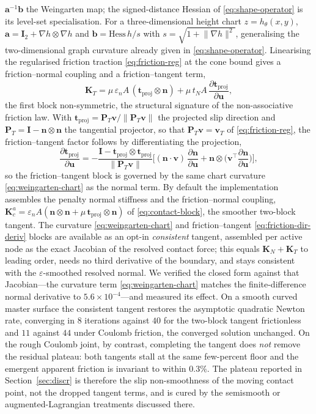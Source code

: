 \documentclass{svjour3}                 %
\newcommand{\norm}[1]{\lVert#1\rVert}
\newcommand{\nbf}{\bm{n}}
\newcommand{\tbf}{\bm{t}}
\newcommand{\ubf}{\bm{u}}
\newcommand{\vbf}{\bm{v}}
\newcommand{\grad}{\nabla}
\begin{document}
\begin{appendix}
$\bm a^{-1}\bm b$ the Weingarten map; the signed-distance Hessian of \eqref{eq:shape-operator} is its level-set
specialisation. For a three-dimensional height chart $z=h_\theta(x,y)$, $\bm a=\bm I_2+\grad h\otimes\grad h$ and
$\bm b=\mathrm{Hess}\,h/s$ with $s=\sqrt{1+\norm{\grad h}^2}$, generalising the two-dimensional graph curvature
already given in \eqref{eq:shape-operator}. Linearising the
regularised friction traction \eqref{eq:friction-reg} at the cone bound gives a friction--normal coupling and a
friction--tangent term,
\begin{equation}\label{eq:lin-friction}
\bm K_T=\mu\,\varepsilon_n A\,(\tbf_{\mathrm{proj}}\otimes\nbf)
+\mu\,t_N A\,\frac{\partial\tbf_{\mathrm{proj}}}{\partial\ubf},
\end{equation}
the first block non-symmetric, the structural signature of the non-associative friction law. With
$\tbf_{\mathrm{proj}}=\bm P_T\vbf/\norm{\bm P_T\vbf}$ the projected slip direction and
$\bm P_T=\bm I-\nbf\otimes\nbf$ the tangential projector, so that $\bm P_T\vbf=\vbf_T$ of
\eqref{eq:friction-reg}, the friction--tangent factor follows by differentiating the projection,
\begin{equation}\label{eq:friction-dir-deriv}
\frac{\partial\tbf_{\mathrm{proj}}}{\partial\ubf}
=-\frac{\bm I-\tbf_{\mathrm{proj}}\otimes\tbf_{\mathrm{proj}}}{\norm{\bm P_T\vbf}}
\Big[(\nbf\!\cdot\!\vbf)\,\frac{\partial\nbf}{\partial\ubf}
+\nbf\otimes\Big(\vbf^{\top}\frac{\partial\nbf}{\partial\ubf}\Big)\Big],
\end{equation}
so the friction--tangent block is governed by the same chart curvature \eqref{eq:weingarten-chart} as the normal
term. By default the
implementation assembles the penalty normal stiffness and the friction--normal coupling,
$\bm K^a_c=\varepsilon_n A(\nbf\otimes\nbf+\mu\,\tbf_{\mathrm{proj}}\otimes\nbf)$ of \eqref{eq:contact-block},
the smoother two-block tangent. The curvature \eqref{eq:weingarten-chart} and friction--tangent
\eqref{eq:friction-dir-deriv} blocks are available as an opt-in \emph{consistent} tangent, assembled per active
node as the exact Jacobian of the resolved contact force; this equals $\bm K_N+\bm K_T$ to leading order, needs
no third derivative of the boundary, and stays consistent with the $\varepsilon$-smoothed resolved normal. We
verified the closed form against that Jacobian---the curvature term \eqref{eq:weingarten-chart} matches the
finite-difference normal derivative to $5.6\times10^{-4}$---and measured its effect. On a smooth curved master
surface the consistent tangent restores the asymptotic quadratic Newton rate, converging in $8$ iterations
against $40$ for the two-block tangent frictionless and $11$ against $44$ under Coulomb friction, the
converged solution unchanged. On the rough Coulomb joint, by contrast, completing the tangent does \emph{not}
remove the residual plateau: both tangents stall at the same few-percent floor and the emergent apparent
friction is invariant to within $0.3\%$. The plateau reported in Section~\ref{sec:discr} is therefore
the slip non-smoothness of the moving contact point, not the dropped tangent terms, and is cured by the
semismooth or augmented-Lagrangian treatments discussed there.


\end{appendix}
\end{document}
